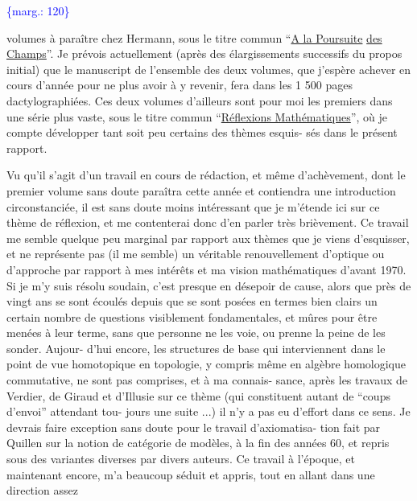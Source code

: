 \documentclass[11pt]{article}
\newcommand{\scanpage}[1]{\par\bigskip\noindent{\small\sffamily[scan #1]}\par}
\newcommand{\mspage}[1]{{\small\sffamily[p.\,#1]}}
\let\over\relax
\newcommand{\over}[2]{\textcolor{gray}{#1}\textcolor{blue}{\ensuremath{^{\!\nearrow}}#2}}
\newcommand{\margin}[1]{\textcolor{blue}{\{\textsf{marg.:} #1\}}}
\newcommand{\uline}[1]{\underline{#1}}
\begin{document}
\margin{120}

\clearpage
\scanpage{119/121}
\mspage{43}

volumes à paraître chez Hermann, sous le titre commun ``\uline{A la Poursuite}
\uline{des Champs}''. Je prévois actuellement (après des élargissements
successifs du propos initial) que le manuscript de l'ensemble des
deux volumes, que j'espère achever en cours d'année pour ne plus
avoir à y revenir, fera dans les 1 500 pages dactylographiées.
Ces deux volumes d'ailleurs sont pour moi les premiers dans une
série plus vaste, sous le titre commun ``\uline{Réflexions Mathématiques}'',
où je compte développer tant soit peu certains des thèmes esquis-%
sés dans le présent rapport.

Vu qu'il s'agit d'un travail en cours de rédaction,
et même d'achèvement, dont le premier volume sans doute paraîtra
cette année et contiendra une introduction circonstanciée, il
est sans doute moins intéressant que je m'étende ici sur ce thème
de réflexion, et me contenterai donc d'en parler très brièvement.
Ce travail me semble quelque peu marginal par rapport aux thèmes
que je viens d'esquisser, et ne représente pas (il me semble) un
véritable renouvellement d'optique ou d'approche par rapport à
mes intérêts et ma vision mathématiques d'avant 1970. Si je m'y
suis résolu soudain, c'est presque en dése\over{r}{s}poir de cause, alors
que près de vingt ans se sont écoulés depuis que se sont posées
en termes bien clairs un certain nombre de questions visiblement
fondamentales, et mûres pour être menées à leur terme, sans que
personne ne les voie, ou prenne la peine de les sonder. Aujour-%
d'hui encore, les structures de base qui interviennent dans le
point de vue homotopique en topologie, y compris même en algèbre
homologique commutative, ne sont pas comprises, et à ma connais-%
sance, après les travaux de Verdier, de Giraud et d'Illusie sur
ce thème (qui constituent autant de ``coups d'envoi'' attendant tou-%
jours une suite ...) il n'y a pas eu d'effort dans ce sens. Je
devrais faire exception sans doute pour le travail d'axiomatisa-%
tion fait par Quillen sur la notion de catégorie de modèles, à
la fin des années 60, et repris sous des variantes diverses par
divers auteurs. Ce travail à l'époque, et maintenant encore, m'a
beaucoup séduit et appris, tout en allant dans une direction assez
\end{document}
